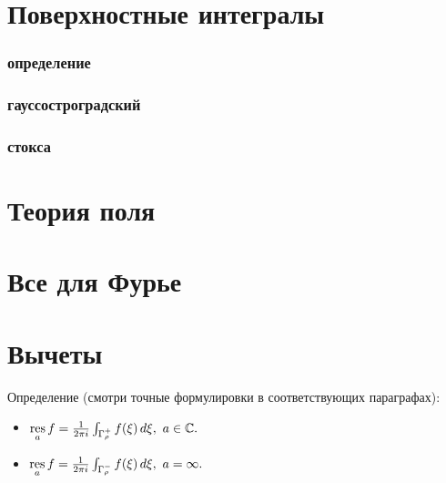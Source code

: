 \section{Поверхностные интегралы}
\subsubsection{определение}
\subsubsection{гауссостроградский}
\subsubsection{стокса}

\section{Теория поля}

\section{Все для Фурье}


\section{Вычеты}
\noindent Определение (смотри точные формулировки в соответствующих параграфах):
\begin{itemize}
\item
$\mathop{\rm res}\limits_a f=\frac{1}{2\pi i} \int_{\Gamma_{\rho}^{+}} f(\xi)\, d\xi,\ a\in\mathbb{C}.$
\item
$\mathop{\rm res}\limits_a f=\frac{1}{2\pi i} \int_{\Gamma_{\rho}^{-}} f(\xi)\, d\xi,\ a=\infty.$
\end{itemize}

